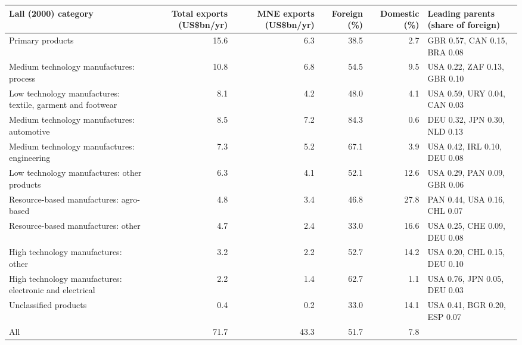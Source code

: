 \begin{tabular}{@{}l r r r r l@{}}
\toprule
Lall (2000) category & Total exports (US\$bn/yr) & MNE exports (US\$bn/yr) & Foreign (\%) & Domestic (\%) & Leading parents (share of foreign) \\
\midrule
Primary products & 15.6 & 6.3 & 38.5 & 2.7 & GBR 0.57, CAN 0.15, BRA 0.08 \\
Medium technology manufactures: process & 10.8 & 6.8 & 54.5 & 9.5 & USA 0.22, ZAF 0.13, GBR 0.10 \\
Low technology manufactures: textile, garment and footwear & 8.1 & 4.2 & 48.0 & 4.1 & USA 0.59, URY 0.04, CAN 0.03 \\
Medium technology manufactures: automotive & 8.5 & 7.2 & 84.3 & 0.6 & DEU 0.32, JPN 0.30, NLD 0.13 \\
Medium technology manufactures: engineering & 7.3 & 5.2 & 67.1 & 3.9 & USA 0.42, IRL 0.10, DEU 0.08 \\
Low technology manufactures: other products & 6.3 & 4.1 & 52.1 & 12.6 & USA 0.29, PAN 0.09, GBR 0.06 \\
Resource-based manufactures: agro-based & 4.8 & 3.4 & 46.8 & 27.8 & PAN 0.44, USA 0.16, CHL 0.07 \\
Resource-based manufactures: other & 4.7 & 2.4 & 33.0 & 16.6 & USA 0.25, CHE 0.09, DEU 0.08 \\
High technology manufactures: other & 3.2 & 2.2 & 52.7 & 14.2 & USA 0.20, CHL 0.15, DEU 0.10 \\
High technology manufactures: electronic and electrical & 2.2 & 1.4 & 62.7 & 1.1 & USA 0.76, JPN 0.05, DEU 0.03 \\
Unclassified products & 0.4 & 0.2 & 33.0 & 14.1 & USA 0.41, BGR 0.20, ESP 0.07 \\
\midrule
All & 71.7 & 43.3 & 51.7 & 7.8 & \\
\bottomrule
\end{tabular}
